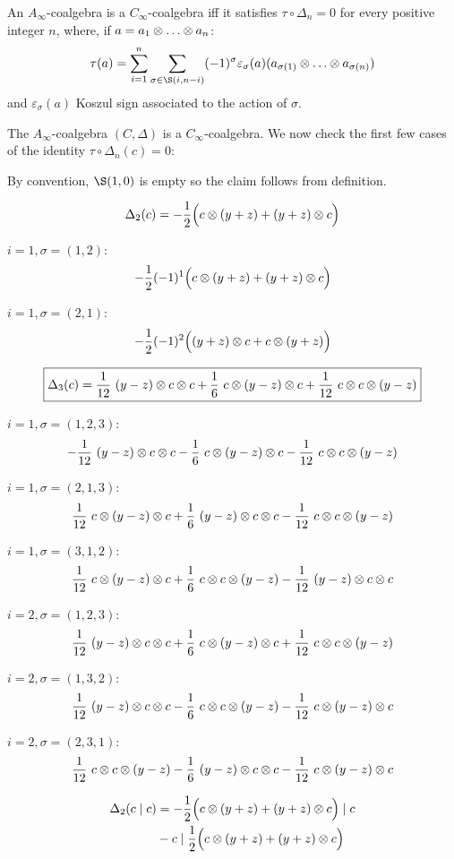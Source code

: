 An $A_\infty$-coalgebra is a $C_\infty$-coalgebra iff it satisfies $\tau \circ \Delta_n = 0$ for every positive integer $n$, where, if $a = a_1 \ot \dots \ot a_n$:
\[
\tau(a) =
\sum_{i=1}^{n} \sum_{\sigma \in \S(i, n-i)} (-1)^{\sigma} \varepsilon_\sigma(a) (a_{\sigma(1)} \ot \dots \ot a_{\sigma(n)})
\]
and $\varepsilon_\sigma(a)$ Koszul sign associated to the action of $\sigma$.

The $A_\infty$-coalgebra $(C, \Delta)$ is a $C_\infty$-coalgebra.
We now check the first few cases of the identity $\tau \circ \Delta_n(c) = 0$:

\fullline

\noindent {}
By convention, $\S(1,0)$ is empty so the claim follows from definition.

\fullline

\noindent {}
\[
\Delta_2(c) = -\frac{1}{2} \Big( c \otimes (y+z) + (y+z) \otimes c \Big)
\]

$i=1, \sigma = (1,2)$:
\[
-\frac{1}{2} (-1)^1 \Big( c \otimes (y+z) + (y+z) \otimes c \Big)
\]

$i=1, \sigma = (2,1)$:
\[
-\frac{1}{2} (-1)^2 \Big( (y+z) \otimes c + c \otimes (y+z)\Big)
\]


\fullline

\noindent {}
\[
\boxed{\Delta_3(c) =
\frac{1}{12} \ (y-z) \otimes c \otimes c + \frac{1}{6} \ c \otimes (y-z) \otimes c + \frac{1}{12} \ c \otimes c \otimes (y-z)}
\]

$i=1, \sigma = (1,2,3)$:
\[
- \frac{1}{12} \ (y-z) \otimes c \otimes c - \frac{1}{6} \ c \otimes (y-z) \otimes c - \frac{1}{12} \ c \otimes c \otimes (y-z)
\]

$i=1, \sigma = (2,1,3)$:
\[
\frac{1}{12} \ c \otimes (y-z) \otimes c + \frac{1}{6} \ (y-z) \otimes c \otimes c - \frac{1}{12} \ c \otimes c \otimes (y-z)
\]

$i=1, \sigma = (3,1,2)$:
\[
\frac{1}{12} \ c \otimes (y-z) \otimes c + \frac{1}{6} \ c \otimes c \otimes (y-z) - \frac{1}{12} \ (y-z) \otimes c \otimes c
\]

$i=2, \sigma = (1,2,3)$:
\[
\frac{1}{12} \ (y-z) \otimes c \otimes c + \frac{1}{6} \ c \otimes (y-z) \otimes c + \frac{1}{12} \ c \otimes c \otimes (y-z)
\]

$i=2, \sigma = (1,3,2)$:
\[
\frac{1}{12} \ (y-z) \otimes c \otimes c - \frac{1}{6} \ c \otimes c \otimes (y-z) - \frac{1}{12} \ c \otimes (y-z) \otimes c
\]

$i=2, \sigma = (2,3,1)$:
\[
\frac{1}{12} \ c \otimes c \otimes (y-z) - \frac{1}{6} \ (y-z) \otimes c \otimes c - \frac{1}{12} \ c \otimes (y-z) \otimes c
\]

\fullline

\newpage
\begin{align*}
\Delta_2(c \mid c) & =
- \frac{1}{2} \Big( c \otimes (y+z) + (y+z) \otimes c \Big) \mid c \\ &
- c \mid\frac{1}{2} \Big( c \otimes (y+z) + (y+z) \otimes c \Big)
\end{align*}